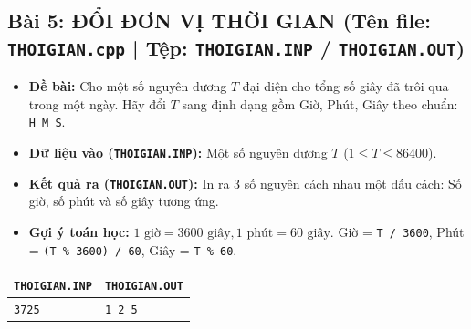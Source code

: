 \documentclass[11pt,a4paper]{article}
\begin{document}
\subsection*{\color{AsianDarkBlue}\small Bài 5: ĐỔI ĐƠN VỊ THỜI GIAN (Tên file: \texttt{THOIGIAN.cpp} | Tệp: \texttt{THOIGIAN.INP} / \texttt{THOIGIAN.OUT})}
\begin{itemize}
    \setlength{\itemsep}{0.5pt}
    \footnotesize
    \item \textbf{Đề bài:} Cho một số nguyên dương $T$ đại diện cho tổng số giây đã trôi qua trong một ngày. Hãy đổi $T$ sang định dạng gồm Giờ, Phút, Giây theo chuẩn: \texttt{H M S}.
    \item \textbf{Dữ liệu vào (\texttt{THOIGIAN.INP}):} Một số nguyên dương $T$ ($1 \le T \le 86400$).
    \item \textbf{Kết quả ra (\texttt{THOIGIAN.OUT}):} In ra 3 số nguyên cách nhau một dấu cách: Số giờ, số phút và số giây tương ứng.
    \item \textbf{Gợi ý toán học:} $1\text{ giờ} = 3600\text{ giây}, 1\text{ phút} = 60\text{ giây}$. Giờ = \texttt{T / 3600}, Phút = \texttt{(T \% 3600) / 60}, Giây = \texttt{T \% 60}.
\end{itemize}
\vspace{-2mm}
\begin{center}
\footnotesize
\begin{tabular}{|p{7.8cm}|p{7.8cm}|}
\hline
\textbf{\texttt{THOIGIAN.INP}} & \textbf{\texttt{THOIGIAN.OUT}} \\
\hline
\texttt{3725} & \texttt{1 2 5} \\
\hline
\end{tabular}
\end{center}

\vspace{-2mm}
\end{document}
